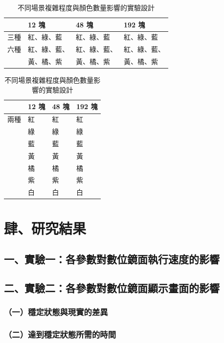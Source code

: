 \documentclass[12pt]{article}
\begin{document}
\begin{table}[h]
  \centering
  \caption{不同場景複雜程度與顏色數量影響的實驗設計}\label{table:sc3_des}
  \begin{tabular}{p{1cm}p{3cm}p{3cm}p{3cm}}
    \toprule
    & 12 塊 & 48 塊 & 192 塊 \\ 
    \midrule
    三種 & 紅、綠、藍 & 紅、綠、藍 & 紅、綠、藍 \\ 
    六種 & 紅、綠、藍、 & 紅、綠、藍、 & 紅、綠、藍、 \\ 
    & 黃、橘、紫 & 黃、橘、紫 & 黃、橘、紫 \\ 
    \bottomrule
  \end{tabular}
  \begin{tabular}{p{1cm}p{3cm}p{3cm}p{3cm}}
    \toprule
    & 12 塊 & 48 塊 & 192 塊 \\ 
    \midrule
    兩種 & 紅 & 紅 & 紅 \\ 
    & 綠 & 綠 & 綠 \\ 
    & 藍 & 藍 & 藍 \\ 
    & 黃 & 黃 & 黃 \\ 
    & 橘 & 橘 & 橘 \\ 
    & 紫 & 紫 & 紫 \\ 
    & 白 & 白 & 白 \\ 
    \bottomrule
  \end{tabular}
\end{table}

\newpage

\section{肆、研究結果}

\subsection{一、實驗一：各參數對數位鏡面執行速度的影響}

\subsection{二、實驗二：各參數對數位鏡面顯示畫面的影響}

\subsubsection{（一）穩定狀態與現實的差異}

\subsubsection{（二）達到穩定狀態所需的時間}
\end{document}
